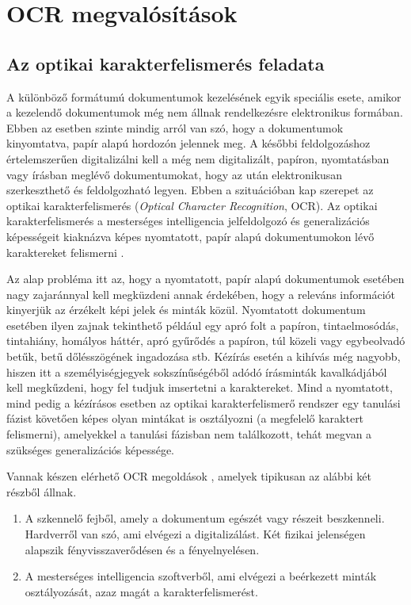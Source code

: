 \section{OCR megvalósítások}

\subsection{Az optikai karakterfelismerés feladata}

A különböző formátumú dokumentumok kezelésének egyik speciális esete, amikor a kezelendő dokumentumok még nem állnak rendelkezésre elektronikus formában. Ebben az esetben szinte mindig arról van szó, hogy a dokumentumok kinyomtatva, papír alapú hordozón jelennek meg. A későbbi feldolgozáshoz értelemszerűen digitalizálni kell a még nem digitalizált, papíron, nyomtatásban vagy írásban meglévő dokumentumokat, hogy az után elektronikusan szerkeszthető és feldolgozható legyen. Ebben a szituációban kap szerepet az optikai karakterfelismerés (\textit{Optical Character Recognition}, OCR). Az optikai karakterfelismerés a mesterséges intelligencia jelfeldolgozó és generalizációs képességeit kiaknázva képes nyomtatott, papír alapú dokumentumokon lévő karaktereket felismerni \cite{liu2013online}.

Az alap probléma itt az, hogy a nyomtatott, papír alapú dokumentumok esetében nagy zajaránnyal kell megküzdeni annak érdekében, hogy a releváns információt kinyerjük az érzékelt képi jelek és minták közül. Nyomtatott dokumentum esetében ilyen zajnak tekinthető például egy apró folt a papíron, tintaelmosódás, tintahiány, homályos háttér, apró gyűrődés a papíron, túl közeli vagy egybeolvadó betűk, betű dőlésszögének ingadozása stb. Kézírás esetén a kihívás még nagyobb, hiszen itt a személyiségjegyek sokszínűségéből adódó írásminták kavalkádjából kell megkűzdeni, hogy fel tudjuk imsertetni a karaktereket. Mind a nyomtatott, mind pedig a kézírásos esetben az optikai karakterfelismerő rendszer egy tanulási fázist követően képes olyan mintákat is osztályozni (a megfelelő karaktert felismerni), amelyekkel a tanulási fázisban nem találkozott, tehát megvan a szükséges generalizációs képessége.

Vannak készen elérhető OCR megoldások \cite{tmwebdvi77}, amelyek tipikusan az alábbi két részből állnak.
\begin{enumerate}
\item A szkennelő fejből, amely a dokumentum egészét vagy részeit beszkenneli. Hardverről van szó, ami elvégezi a digitalizálást. Két fizikai jelenségen alapszik fényvisszaverődésen és a fényelnyelésen.
\item  A mesterséges intelligencia szoftverből, ami elvégezi a beérkezett minták osztályozását, azaz magát a karakterfelismerést.
\end{enumerate}

